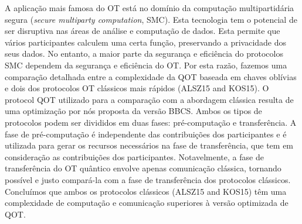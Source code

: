\documentclass[11pt]{report}
\begin{document}
A aplicação mais famosa do OT está no domínio da computação multipartidária segura (\textit{secure multiparty computation}, SMC). Esta tecnologia tem o potencial de ser disruptiva nas áreas de análise e computação de dados. Esta permite que vários participantes calculem uma certa função, preservando a privacidade dos seus dados. No entanto, a maior parte da segurança e eficiência do protocolos SMC dependem da segurança e eficiência do OT. Por esta razão, fazemos uma comparação detalhada entre a complexidade da QOT baseada em chaves oblívias e dois dos protocolos OT clássicos mais rápidos (ALSZ15 and KOS15). O protocol QOT utilizado para a comparação com a abordagem clássica resulta de uma optimização por nós proposta da versão BBCS. Ambos os tipos de protocolos podem ser divididos em duas fases: pré-computação e transferência. A fase de pré-computação é independente das contribuições dos participantes e é utilizada para gerar os recursos necessários na fase de transferência, que tem em consideração as contribuições dos participantes. Notavelmente, a fase de transferência do OT quântico envolve apenas comunicação clássica, tornando possível e justo compará-la com a fase de transferência dos protocolos clássicos. Concluímos que ambos os protocolos clássicos (ALSZ15 and KOS15) têm uma complexidade de computação e comunicação superiores à versão optimizada de QOT.
\end{document}
